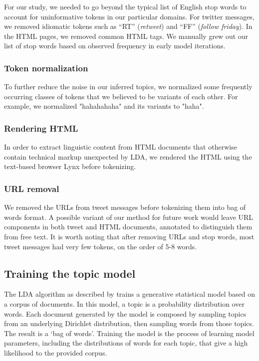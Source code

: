 \documentclass[times, 11pt, twocolumn]{article}
\begin{document}
For our study, we needed to go beyond the typical list of English stop words to account for uninformative tokens in our particular domains.
For twitter messages, we removed idiomatic tokens such as ``RT'' (\emph{retweet}) and ``FF'' (\emph{follow friday}).
In the HTML pages, we removed common HTML tags.  We manually grew out our list of stop words based on observed frequency
in early model iterations.

\subsubsection{Token normalization}

To further reduce the noise in our inferred topics, we normalized some frequently occurring classes of tokens
that we believed to be variants of each other.
For example, we normalized "hahahahaha" and its variants to "haha".

\subsubsection{Rendering HTML}

In order to extract linguistic content from HTML documents that otherwise contain technical markup unexpected by LDA,
we rendered the HTML using the text-based browser Lynx before tokenizing.

\subsubsection{URL removal}

We removed the URLs from tweet messages before tokenizing them into bag of words format.
A possible variant of our method for future work would leave URL components in both tweet and HTML documents,
annotated to distinguish them from free text.
It is worth noting that after removing URLs and stop words, most tweet messages had very few tokens, on the order of 5-8 words.


\subsection{Training the topic model}

The LDA algorithm as described by \cite{Blei2003} trains a generative statistical model based on a corpus of documents.
In this model, a topic is a probability distribution over words.
Each document generated by the model is composed by sampling topics from an underlying Dirichlet distribution,
then sampling words from those topics.
The result is a `bag of words'.
Training the model is the process of learning model parameters, including the distributions of words for each topic, that give a high likelihood to the provided corpus.
\end{document}
